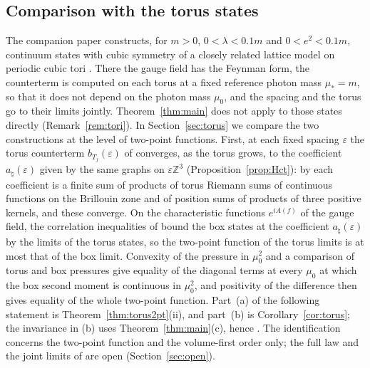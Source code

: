 \documentclass[11pt]{amsart}
\theoremstyle{plain}
\theoremstyle{definition}
\theoremstyle{remark}
\numberwithin{equation}{section}
\newcommand{\Z}{\mathbb{Z}}
\newcommand{\eps}{\varepsilon}
\begin{document}
\subsection{Comparison with the torus states}
The companion paper \cite{v1} constructs, for $m>0$, $0<\lambda<0.1m$ and $0<e^2<0.1m$, continuum states with cubic symmetry of a closely related lattice model on periodic cubic tori \cite[Thm.~3.1]{v1}. There the gauge field has the Feynman form, the counterterm is computed on each torus at a fixed reference photon mass $\mu_*=m$, so that it does not depend on the photon mass $\mu_0$, and the spacing and the torus go to their limits jointly. Theorem~\ref{thm:main} does not apply to those states directly (Remark~\ref{rem:tori}). In Section~\ref{sec:torus} we compare the two constructions at the level of two-point functions. First, at each fixed spacing $\eps$ the torus counterterm $b_{T_j}(\eps)$ of \cite{v1} converges, as the torus grows, to the coefficient $a_\natural(\eps)$ given by the same graphs on $\eps\Z^3$ (Proposition~\ref{prop:Hct}): by \cite[Lemma~G.1]{v1} each coefficient is a finite sum of products of torus Riemann sums of continuous functions on the Brillouin zone and of position sums of products of three positive kernels, and these converge. On the characteristic functions $e^{iA(f)}$ of the gauge field, the correlation inequalities of \cite{BFS1} bound the box states at the coefficient $a_\natural(\eps)$ by the limits of the torus states, so the two-point function of the torus limits is at most that of the box limit. Convexity of the pressure in $\mu_0^2$ and a comparison of torus and box pressures give equality of the diagonal terms at every $\mu_0$ at which the box second moment is continuous in $\mu_0^2$, and positivity of the difference then gives equality of the whole two-point function. Part~(a) of the following statement is Theorem~\ref{thm:torus2pt}(ii), and part~(b) is Corollary~\ref{cor:torus}; the invariance in (b) uses Theorem~\ref{thm:main}(c), hence \cite[Thm.~18.21]{S}. The identification concerns the two-point function and the volume-first order only; the full law and the joint limits of \cite{v1} are open (Section~\ref{sec:open}).
\end{document}
